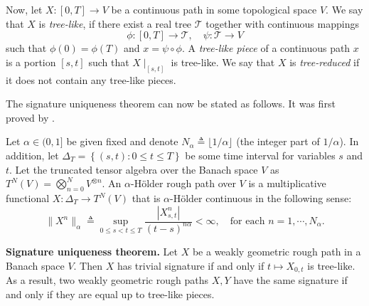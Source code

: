 Now, let $X : [0, T] \to V$ be a continuous path in some topological space $V$. We say that $X$ is \textit{tree-like}, if there exist a real tree $\mathcal{T}$ together with continuous mappings
\[
\phi : [0, T] \to \mathcal{T}, \quad \psi : \mathcal{T} \to V
\]
such that $\phi(0) = \phi(T)$ and $x = \psi \circ \phi$. A \textit{tree-like piece} of a continuous path $x$ is a portion $[s, t]$ such that $X\mid_{[s,t]}$ is tree-like. We say that $X$ is \textit{tree-reduced} if it does not contain any tree-like pieces.


The signature uniqueness theorem can now be stated as follows. It was first
proved by \cite{boedihardjo2016signature}.


Let $\alpha \in (0,1]$ be given fixed and denote $N_{\alpha} \triangleq \lfloor 1/\alpha \rfloor$ (the integer part of $1/\alpha$). In addition, let $\Delta _{T} = \left\{ ( s,t) : 0 \le t \le T \right\} $ be some time interval for variables $s $
and $t$. Let the truncated tensor algebra over the Banach space $V$ as $T^{N}( V) = \bigotimes_{n= 0} ^{N} V^{ \otimes n}  $.     An $\alpha$-Hölder rough path over $V$ is a multiplicative functional $X : \Delta_T \to T_{}^N(V)$ that is $\alpha$-Hölder continuous in the following sense:
\[
\|X^n\|_{\alpha} \triangleq \sup_{0 \leq s < t \leq T} \frac{|X_{s,t}^n|}{(t-s)^{n\alpha}} < \infty, \quad \text{for each } n = 1, \cdots, N_{\alpha}.
\]



\begin{theorem}
\textbf{Signature uniqueness theorem.}
Let $X$ be a weakly geometric rough path in a Banach space $V$. Then $X$ has trivial signature if and only if $t \mapsto X_{0,t}$ is tree-like. As a result, two weakly geometric rough paths $X, Y$ have the same signature if and only if they are equal up to tree-like pieces.
\end{theorem}







